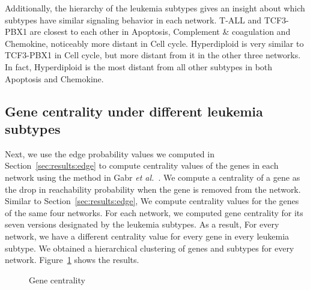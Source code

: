 \documentclass[runningheads,a4paper]{llncs}
\newcommand{\goodgap}{
        \hspace{\subfigtopskip}
        \hspace{\subfigbottomskip}}
\begin{document}
Additionally, the hierarchy of the leukemia subtypes gives an insight about
which subtypes have similar signaling behavior in each network. T-ALL and
TCF3-PBX1 are closest to each other in Apoptosis, Complement \& coagulation and
Chemokine, noticeably more distant in Cell cycle. Hyperdiploid is very similar
to TCF3-PBX1 in Cell cycle, but more distant from it in the other three
networks. In fact, Hyperdiploid is the most distant from all other subtypes in
both Apoptosis and Chemokine.

\subsection{Gene centrality under different leukemia subtypes}
Next, we use the edge probability values we computed in
Section~\ref{sec:results:edge} to compute centrality values of the genes in
each network using the method in Gabr {\it et al.}~\cite{preach_bio}.
We compute a centrality of a gene as the drop in reachability probability when
the gene is removed from the network. Similar to
Section~\ref{sec:results:edge}, We compute centrality values for the genes of
the same four networks. For each network, we computed gene centrality for
its seven versions designated by the leukemia subtypes. As a result, For every
network, we have a different centrality value for every gene in every leukemia
subtype. We obtained a hierarchical clustering of genes and subtypes for every
network. Figure~\ref{fig:cent_cluster} shows the results.

\begin{figure}[t]
\centering
{}
\goodgap
{}
\goodgap
{}
\goodgap
{}
\caption{Gene centrality}
\label{fig:cent_cluster}
\end{figure}
\end{document}
